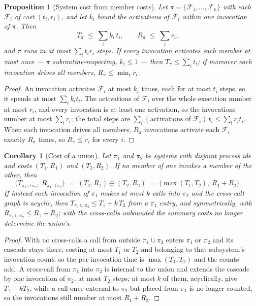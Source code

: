 \documentclass[11pt,a4paper]{article}
\newcommand{\F}{\mathcal{F}}
\theoremstyle{accentdef}
\theoremstyle{accentplain}
\newtheorem{proposition}[definition]{Proposition}
\newtheorem{corollary}[definition]{Corollary}
\begin{document}
\begin{proposition}[System cost from member costs]\label{prop:syscost}
Let $\pi = \{\F_1,\ldots,\F_n\}$ with each $\F_i$ of cost $(t_i, r_i)$, and let $k_i$ bound the
activations of $\F_i$ within one invocation of $\pi$. Then
\[
  T_\pi \;\le\; \sum_{i} k_i\, t_i , \qquad R_\pi \;\le\; \sum_{i} r_i ,
\]
and $\pi$ runs in at most $\sum_i t_i r_i$ steps. If every invocation activates each member at most
once --- $\pi$ subroutine-respecting, $k_i \le 1$ --- then $T_\pi \le \sum_i t_i$; if moreover each
invocation drives all members, $R_\pi \le \min_i r_i$.
\end{proposition}

\begin{proof}
An invocation activates $\F_i$ at most $k_i$ times, each for at most $t_i$ steps, so it spends at
most $\sum_i k_i t_i$. The activations of $\F_i$ over the whole execution number at most $r_i$, and
every invocation is at least one activation, so the invocations number at most $\sum_i r_i$; the
total steps are $\sum_i (\text{activations of }\F_i)\, t_i \le \sum_i r_i t_i$. When each
invocation drives all members, $R_\pi$ invocations activate each $\F_i$ exactly $R_\pi$ times, so
$R_\pi \le r_i$ for every $i$.
\end{proof}

\begin{corollary}[Cost of a union]\label{cor:syscost}
Let $\pi_1$ and $\pi_2$ be systems with disjoint process ids and costs $(T_1,R_1)$ and
$(T_2,R_2)$. If no member of one invokes a member of the other, then
\[
  \bigl(T_{\pi_1 \cup \pi_2},\ R_{\pi_1 \cup \pi_2}\bigr) \;=\; (T_1,R_1) \oplus (T_2,R_2)
  \;=\; \bigl(\max(T_1,T_2),\ R_1 + R_2\bigr) .
\]
If instead each invocation of $\pi_1$ makes at most $k$ calls into $\pi_2$ and the cross-call graph
is acyclic, then $T_{\pi_1 \cup \pi_2} \le T_1 + k\,T_2$ from a $\pi_1$ entry, and symmetrically,
with $R_{\pi_1 \cup \pi_2} \le R_1 + R_2$; with the cross-calls unbounded the summary costs no
longer determine the union's.
\end{corollary}

\begin{proof}
With no cross-calls a call from outside $\pi_1 \cup \pi_2$ enters $\pi_1$ or $\pi_2$ and its cascade
stays there, costing at most $T_1$ or $T_2$ and belonging to that subsystem's invocation count; so
the per-invocation time is $\max(T_1,T_2)$ and the counts add. A cross-call from $\pi_1$ into
$\pi_2$ is internal to the union and extends the cascade by one invocation of $\pi_2$, at most $T_2$
steps; at most $k$ of them, acyclically, give $T_1 + k T_2$, while a call once external to $\pi_2$
but placed from $\pi_1$ is no longer counted, so the invocations still number at most $R_1 + R_2$.
\end{proof}
\end{document}
